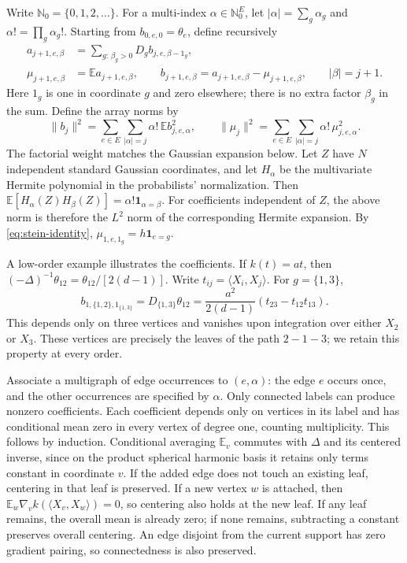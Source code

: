 \documentclass[11pt,reqno]{amsart}
\numberwithin{equation}{section}
\theoremstyle{definition}
\theoremstyle{remark}
\theoremstyle{definition}
\begin{document}
Write $\mathbb N_0=\{0,1,2,\ldots\}$. For a multi-index $\alpha\in\mathbb N_0^E$, let $|\alpha|=\sum_g\alpha_g$ and
$\alpha!=\prod_g\alpha_g!$. Starting from $b_{0,e,0}=\theta_e$, define recursively
\begin{equation}\label{eq:array-recursion}
 \begin{split}
 a_{j+1,e,\beta}&=\sum_{g:\,\beta_g>0}D_gb_{j,e,\beta-1_g},\\
 \mu_{j+1,e,\beta}&=\mathbb Ea_{j+1,e,\beta},\qquad
 b_{j+1,e,\beta}=a_{j+1,e,\beta}-\mu_{j+1,e,\beta},
 \qquad |\beta|=j+1.
 \end{split}
\end{equation}
Here $1_g$ is one in coordinate $g$ and zero elsewhere; there is no extra factor $\beta_g$ in the sum.
Define the array norms by
\[
 \|b_j\|^2=\sum_{e\in E}\sum_{|\alpha|=j}\alpha!\,\mathbb E b_{j,e,\alpha}^2,
 \qquad
 \|\mu_j\|^2=\sum_{e\in E}\sum_{|\alpha|=j}\alpha!\,\mu_{j,e,\alpha}^2.
\]
The factorial weight matches the Gaussian expansion below. Let $Z$ have $N$ independent standard Gaussian coordinates,
and let $H_\alpha$ be the multivariate Hermite polynomial in the probabilists' normalization. Then
$\mathbb E[H_\alpha(Z)H_\beta(Z)]=\alpha!\mathbf1_{\alpha=\beta}$.
For coefficients independent of $Z$, the above norm is therefore the $L^2$ norm of the corresponding Hermite expansion.
By \eqref{eq:stein-identity}, $\mu_{1,e,1_g}=h\mathbf1_{e=g}$.

A low-order example illustrates the coefficients. If $k(t)=at$, then
$(-\Delta)^{-1}\theta_{12}=\theta_{12}/[2(d-1)]$. Write
$t_{ij}=\langle X_i,X_j\rangle$. For $g=\{1,3\}$,
\[
 b_{1,\{1,2\},1_{\{1,3\}}}
 =D_{\{1,3\}}\theta_{12}
 =\frac{a^2}{2(d-1)}(t_{23}-t_{12}t_{13}).
\]
This depends only on three vertices and vanishes upon integration over either $X_2$ or $X_3$.
These vertices are precisely the leaves of the path $2\!-\!1\!-\!3$; we retain this property at every order.

Associate a multigraph of edge occurrences to $(e,\alpha)$: the edge $e$ occurs once, and the other occurrences are specified by $\alpha$.
Only connected labels can produce nonzero coefficients. Each coefficient depends only on vertices in its label
and has conditional mean zero in every vertex of degree one, counting multiplicity.
This follows by induction. Conditional averaging $\mathbb E_v$ commutes with $\Delta$ and its centered inverse,
since on the product spherical harmonic basis it retains only terms constant in coordinate $v$.
If the added edge does not touch an existing leaf, centering in that leaf is preserved.
If a new vertex $w$ is attached, then
$\mathbb E_w\nabla_v k(\langle X_v,X_w\rangle)=0$, so centering also holds at the new leaf.
If any leaf remains, the overall mean is already zero; if none remains, subtracting a constant preserves overall centering.
An edge disjoint from the current support has zero gradient pairing, so connectedness is also preserved.
\end{document}

